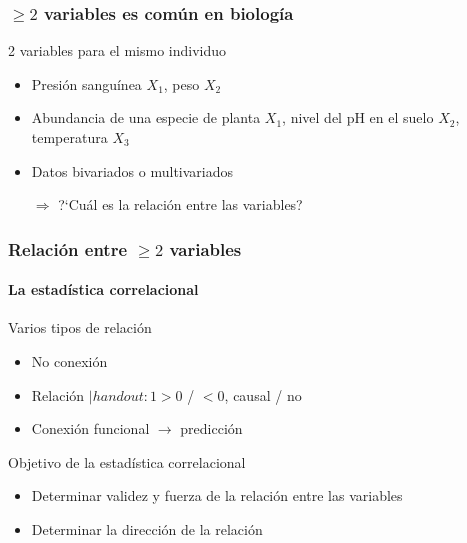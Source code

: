 \documentclass[mathserif]{beamer}
\begin{document}
 
\begin{frame}[label=regrprec]
   \frametitle{$\geq 2$ variables es com\'un en biolog\'ia}
   \begin{exampleblock}{2 variables para el mismo individuo}
      \begin{itemize}
         \item Presi\'on sangu\'inea $X_1$, peso $X_2$
         \item Abundancia de una especie de planta $X_1$, nivel del pH en el suelo $X_2$, temperatura $X_3$ 
      \end{itemize}
   \end{exampleblock}
   \begin{itemize}
      \item Datos \alert{bi}variados o \alert{multi}variados
      \medskip
      \item[$\Rightarrow$] ?`Cu\'al es la relaci\'on entre las variables?
   \end{itemize}
\end{frame}%


\begin{frame}[label=corroverv1]
   \frametitle{Relaci\'on entre $\geq 2$ variables}
   \framesubtitle{La estad\'istica correlacional}
   \begin{block}{Varios tipos de relaci\'on}
      \begin{itemize}
         \item No conexi\'on
         \item Relaci\'on $| handout:1>0$ / $<0$, causal / no
         \item Conexi\'on funcional $\rightarrow$ predicci\'on
      \end{itemize}
   \end{block}
   \begin{block}{Objetivo de la estad\'istica correlacional}
      \begin{itemize}
         \item Determinar validez y fuerza de la relaci\'on entre las variables
         \item Determinar la direcci\'on de la relaci\'on
      \end{itemize}
   \end{block}
\end{frame}%
\end{document}
